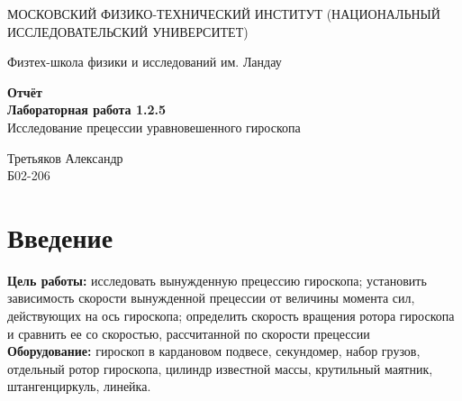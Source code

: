 \documentclass[a4paper,12pt]{article}
\begin{document}
	\begin{titlepage}
		\begin{center}
			{\large МОСКОВСКИЙ ФИЗИКО-ТЕХНИЧЕСКИЙ ИНСТИТУТ (НАЦИОНАЛЬНЫЙ ИССЛЕДОВАТЕЛЬСКИЙ УНИВЕРСИТЕТ)}
		\end{center}
		\begin{center}
			{\large Физтех-школа физики и исследований им. Ландау}
		\end{center}
		
		
		\vspace{4.5cm}
		{\huge
			\begin{center}
				{\bf Отчёт \\ Лабораторная работа 1.2.5}\\
				Исследование прецессии уравновешенного гироскопа 
			\end{center}
		}
		\vspace{2cm}
		\begin{flushright}
			{\LARGE Третьяков Александр\\
				\vspace{0.2cm}
				Б02-206}
		\end{flushright}
		\vspace{8cm}
	\end{titlepage}
	
	\section{Введение}
	
	\textbf{Цель работы:} исследовать вынужденную прецессию гироскопа; установить зависимость скорости вынужденной прецессии от величины момента сил, действующих на ось гироскопа; определить скорость вращения ротора гироскопа и сравнить ее со скоростью, рассчитанной по скорости прецессии\\
	\textbf{Оборудование:} гироскоп в кардановом подвесе, секундомер, набор грузов, отдельный ротор гироскопа, цилиндр известной массы, крутильный маятник, штангенциркуль, линейка.
	
\end{document}
